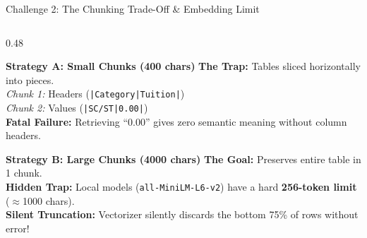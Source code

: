 \documentclass[11pt]{beamer}
\begin{document}
\begin{frame}{Challenge 2: The Chunking Trade-Off \& Embedding Limit}
    \begin{columns}[T]
        \begin{column}{0.48\textwidth}
            \begin{alertblock}{\textbf{Strategy A: Small Chunks (400 chars)}}
                \tiny
                \textbf{The Trap:} Tables sliced horizontally into pieces.\\[2pt]
                \textit{Chunk 1:} Headers (\texttt{|Category|Tuition|})\\
                \textit{Chunk 2:} Values (\texttt{|SC/ST|0.00|})\\[3pt]
                \textbf{Fatal Failure:} Retrieving ``0.00'' gives zero semantic meaning without column headers.
            \end{alertblock}
            \vspace{2pt}
            \begin{alertblock}{\textbf{Strategy B: Large Chunks (4000 chars)}}
                \tiny
                \textbf{The Goal:} Preserves entire table in 1 chunk.\\[2pt]
                \textbf{Hidden Trap:} Local models (\texttt{all-MiniLM-L6-v2}) have a hard \textbf{256-token limit} ($\approx$1000 chars).\\[3pt]
                \textbf{Silent Truncation:} Vectorizer silently discards the bottom 75\% of rows without error!
            \end{alertblock}
        \end{column}
        

\end{columns}
\end{frame}
\end{document}
